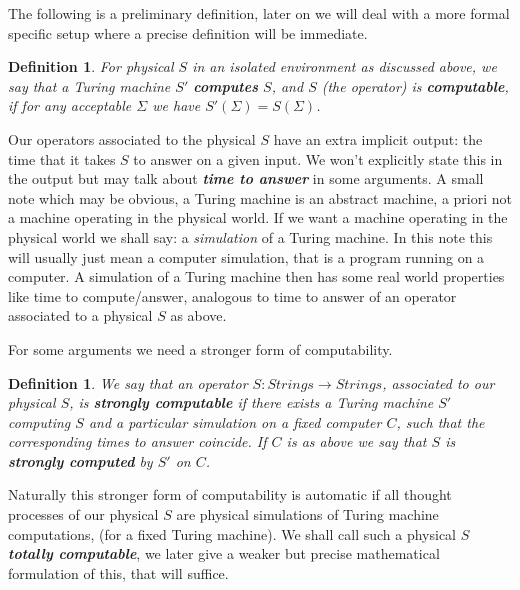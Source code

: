 \documentclass[9pt,twocolumn,twoside,lineno]{pnas-new}
\numberwithin{equation}{section}
\newtheorem{definition}[equation]{Definition}
\theoremstyle{definition}
\theoremstyle{remark}
\begin{document}
The following is a preliminary definition, later on we will deal with a more formal specific setup where a precise definition will be immediate.
\begin{definition} \label{def:compute}
For physical $S$ in an isolated environment as discussed above, we say that a Turing machine $S'$ \textbf{\emph{computes}} $S$, and $S$ (the operator) is \textbf{\emph{computable}}, if for any acceptable $\Sigma $ 
   we have $S'   (\Sigma) =S  (\Sigma)$. 
\end{definition}
Our operators associated to the physical $S$ have an extra implicit output: the time that it takes $S$ to answer on a given input. We won't explicitly state this in the output but may talk about \textbf{\emph{time to answer}} in some arguments. A small note which may be obvious, a Turing machine is an abstract machine, a priori not a machine operating in the physical world. If we want a machine operating in the physical world we shall say: a \emph{simulation} of a Turing machine. In this note this will usually just mean a computer simulation, that is a program running on a computer. A simulation of a Turing machine then has some real world properties like time to compute/answer, analogous to time to answer of an operator associated to a physical $S$ as above.

For some arguments we need a stronger form of computability.
\begin{definition} \label {def:computeStrong} We say that an operator $S:Strings \to Strings$, associated to our physical $S$, is \textbf{\emph{strongly computable}} if there exists a Turing machine $S'$ computing $S$ and a particular simulation on a fixed computer $C$, such that the corresponding times to answer coincide. If $C$ is as above we say that $S$ is \textbf{\emph{strongly computed}} by $S'$ on $C$.
\end{definition}
Naturally this stronger form of computability is automatic if all thought processes of our physical $S$ 
are physical simulations of Turing machine computations, (for a fixed Turing machine).
We shall call such a physical $S$ \textbf{\emph{totally computable}}, we later
give a weaker but precise mathematical formulation of this, that will suffice.  
\end{document}
